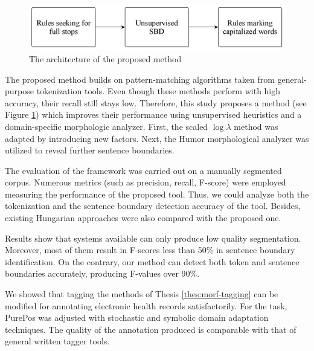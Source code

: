 \begin{figure}[H]
  \centering
  \includegraphics[scale=0.2]{Clinical/clin_segm_arch.png} 
  \caption{The architecture of the proposed method}
  \label{fig:clin-segment-arch_en}
\end{figure}

The proposed method builds on pattern-matching algorithms taken from general-purpose tokenization tools.
Even though these methods perform with high accuracy, their recall still stays low.
Therefore, this study proposes a method (see Figure \ref{fig:clin-segment-arch_en}) which improves their performance using unsupervised heuristics and a domain-specific morphologic analyzer.
First, the scaled $\log\lambda$  method \cite{kiss2006unsupervised} was adapted by introducing new factors.
Next, the Humor morphological analyzer was utilized to reveal further sentence boundaries.

The evaluation of the framework was carried out on a manually segmented corpus. 
Numerous metrics (such as precision, recall, F-score) were employed measuring the performance of the proposed tool.
Thus, we could analyze both the tokenization and the sentence boundary detection accuracy of the tool.
Besides, existing Hungarian approaches were also compared with the proposed one.

Results show that systems available can only produce low quality segmentation.
Moreover, most of them result in F-scores less than 50\% in sentence boundary identification.
On the contrary, our method can detect both token and sentence boundaries accurately, producing F-values over 90\%.


\thesisline%

\begin{core}
\begin{thesis}%
\label{thes:clin-pos}
We showed that tagging the methods of Thesis \ref{thes:morf-tagging} can be modified for annotating electronic health records satisfactorily.
For the task, PurePos was adjusted with stochastic and symbolic domain adaptation techniques.
The quality of the annotation produced is comparable with that of general written tagger tools.
\end{thesis}

\begin{pub}
\cite{Orosz2013,Orosz2014b,Orosz2014x} 
\end{pub}
\end{core}


